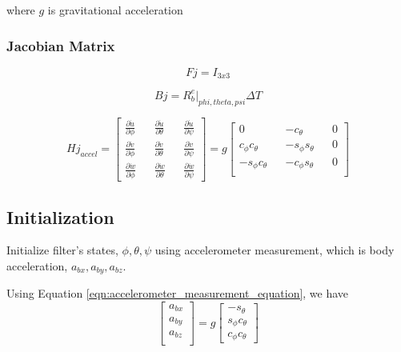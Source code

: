 \documentclass[]{article}
\begin{document}
where $g$ is gravitational acceleration

\subsubsection{Jacobian Matrix}

\begin{equation}
Fj = I_{3x3}
\end{equation}

\begin{equation}
Bj = R^e_b|_{phi, theta, psi} \Delta T
\end{equation}

\begin{equation}
Hj_{accel} = 
\begin{bmatrix}
\frac{\partial \dot{u}}{\partial \phi} && \frac{\partial \dot{u}}{\partial \theta} && \frac{\partial \dot{u}}{\partial \psi} \\
\frac{\partial \dot{v}}{\partial \phi} && \frac{\partial \dot{v}}{\partial \theta} && \frac{\partial \dot{v}}{\partial \psi} \\
\frac{\partial \dot{w}}{\partial \phi} && \frac{\partial \dot{w}}{\partial \theta} && \frac{\partial \dot{w}}{\partial \psi}
\end{bmatrix} = g
\begin{bmatrix}
0 && -c_{\theta} && 0 \\
c_{\phi}c_{\theta} && -s_{\phi}s_{\theta} && 0 \\
-s_{\phi}c_{\theta} && -c_{\phi}s_{\theta} && 0 \\
\end{bmatrix}
\end{equation}

\subsection{Initialization}
Initialize filter's states, $\phi, \theta, \psi$ using accelerometer measurement, which is body acceleration, $a_{bx}, a_{by}, a_{bz}$.

Using Equation \ref{eqn:accelerometer_measurement_equation}, we have 
\begin{equation}
\begin{bmatrix}
a_{bx} \\
a_{by} \\
a_{bz} \\
\end{bmatrix} = g
\begin{bmatrix}
-s_\theta \\
s_\phi c_\theta \\
c_\phi c_\theta
\end{bmatrix}
\end{equation}
\end{document}
